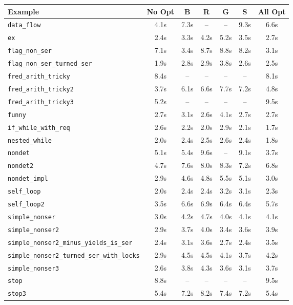 \begin{tabular}{lcccccc}
\toprule
Example & No Opt & B & R & G & S & All Opt \\
\midrule
\texttt{data_flow} & 4.1s & 7.3s & -- & -- & 9.3s & 6.6s \\
\texttt{ex} & 2.4s & 3.3s & 4.2s & 5.2s & 3.5s & 2.7s \\
\texttt{flag_non_ser} & 7.1s & 3.4s & 8.7s & 8.8s & 8.2s & 3.1s \\
\texttt{flag_non_ser_turned_ser} & 1.9s & 2.8s & 2.9s & 3.8s & 2.6s & 2.5s \\
\texttt{fred_arith_tricky} & 8.4s & -- & -- & -- & -- & 8.1s \\
\texttt{fred_arith_tricky2} & 3.7s & 6.1s & 6.6s & 7.7s & 7.2s & 4.8s \\
\texttt{fred_arith_tricky3} & 5.2s & -- & -- & -- & -- & 9.5s \\
\texttt{funny} & 2.7s & 3.1s & 2.6s & 4.1s & 2.7s & 2.7s \\
\texttt{if_while_with_req} & 2.6s & 2.2s & 2.0s & 2.9s & 2.1s & 1.7s \\
\texttt{nested_while} & 2.0s & 2.4s & 2.5s & 2.6s & 2.4s & 1.8s \\
\texttt{nondet} & 5.1s & 5.4s & 9.6s & -- & 9.1s & 3.7s \\
\texttt{nondet2} & 4.7s & 7.6s & 8.0s & 8.3s & 7.2s & 6.8s \\
\texttt{nondet_impl} & 2.9s & 4.6s & 4.8s & 5.5s & 5.1s & 3.0s \\
\texttt{self_loop} & 2.0s & 2.4s & 2.4s & 3.2s & 3.1s & 2.3s \\
\texttt{self_loop2} & 3.5s & 6.6s & 6.9s & 6.4s & 6.4s & 5.7s \\
\texttt{simple_nonser} & 3.0s & 4.2s & 4.7s & 4.0s & 4.1s & 4.1s \\
\texttt{simple_nonser2} & 2.9s & 3.7s & 4.0s & 3.4s & 3.6s & 3.9s \\
\texttt{simple_nonser2_minus_yields_is_ser} & 2.4s & 3.1s & 3.6s & 2.7s & 2.4s & 3.5s \\
\texttt{simple_nonser2_turned_ser_with_locks} & 2.9s & 4.5s & 4.5s & 4.1s & 3.7s & 4.2s \\
\texttt{simple_nonser3} & 2.6s & 3.8s & 4.3s & 3.6s & 3.1s & 3.7s \\
\texttt{stop} & 8.8s & -- & -- & -- & -- & 9.5s \\
\texttt{stop3} & 5.4s & 7.2s & 8.2s & 7.4s & 7.2s & 5.4s \\
\bottomrule
\end{tabular}

